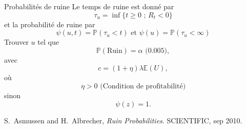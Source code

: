 \documentclass{beamer}
\begin{document}
\begin{frame}{Probabilités de ruine}
\scriptsize
Le temps de ruine est donné par
$$
\tau_u = \inf\{t\geq0\text{ ; }R_t <0\}
$$
et la probabilité de ruine par
$$
\psi(u,t) = \mathbb{P}(\tau_u < t)\text{ et }\psi(u) = \mathbb{P}(\tau_u < \infty)
$$
Trouver $u$ tel que 
$$
\mathbb{P}(\text{Ruin}) = \alpha\text{ (0.005)},
$$
avec
$$
c=(1+\eta)\lambda\mathbb{E}(U),
$$
où 
$$\eta>0\text{ (Condition de profitabilité)}$$  
sinon 
$$\psi(z)=1.$$

\tiny
\begin{thebibliography}{1}

S.~Asmussen and H.~Albrecher, {\em Ruin Probabilities}.
 {SCIENTIFIC}, sep 2010.

\end{thebibliography}

\end{frame}
\end{document}
